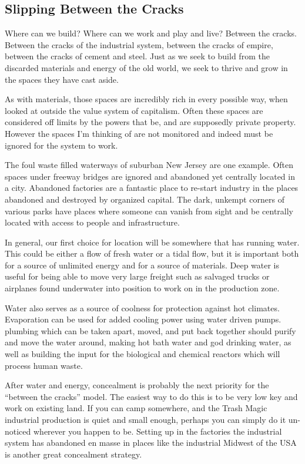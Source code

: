 \subsection{Slipping Between the
Cracks}\label{slipping-between-the-cracks}

Where can we build? Where can we work and play and live? Between the
cracks. Between the cracks of the industrial system, between the cracks
of empire, between the cracks of cement and steel. Just as we seek to
build from the discarded materials and energy of the old world, we seek
to thrive and grow in the spaces they have cast aside.

As with materials, those spaces are incredibly rich in every possible
way, when looked at outside the value system of capitalism. Often these
spaces are considered off limits by the powers that be, and are
supposedly private property. However the spaces I'm thinking of are not
monitored and indeed must be ignored for the system to work.

The foul waste filled waterways of suburban New Jersey are one example.
Often spaces under freeway bridges are ignored and abandoned yet
centrally located in a city. Abandoned factories are a fantastic place
to re-start industry in the places abandoned and destroyed by organized
capital. The dark, unkempt corners of various parks have places where
someone can vanish from sight and be centrally located with access to
people and infrastructure.

In general, our first choice for location will be somewhere that has
running water. This could be either a flow of fresh water or a tidal
flow, but it is important both for a source of unlimited energy and for
a source of materials. Deep water is useful for being able to move very
large freight such as salvaged trucks or airplanes found underwater into
position to work on in the production zone.

Water also serves as a source of coolness for protection against hot
climates. Evaporation can be used for added cooling power using water
driven pumps. plumbing which can be taken apart, moved, and put back
together should purify and move the water around, making hot bath water
and god drinking water, as well as building the input for the biological
and chemical reactors which will process human waste.

After water and energy, concealment is probably the next priority for
the ``between the cracks'' model. The easiest way to do this is to be
very low key and work on existing land. If you can camp somewhere, and
the Trash Magic industrial production is quiet and small enough, perhaps
you can simply do it un-noticed wherever you happen to be. Setting up in
the factories the industrial system has abandoned en masse in places
like the industrial Midwest of the USA is another great concealment
strategy.

